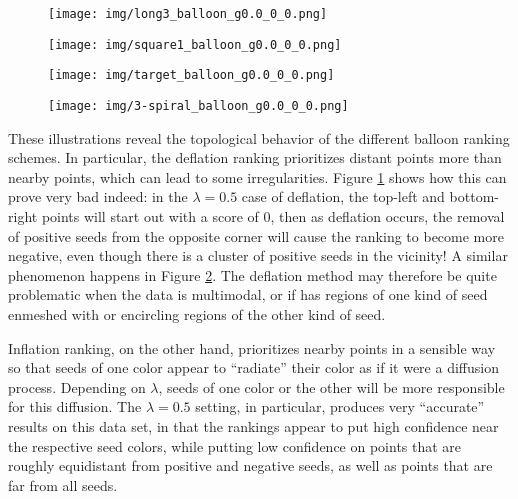 \documentclass[11pt, oneside, fleqn, UTF8]{article} 	%
\theoremstyle{definition}
\begin{document}
\begin{figure*}
    \centering
    
    \begin{subfigure}[b]{\textwidth}
        \centering
        \texttt{[image: img/long3\_balloon\_g0.0\_0\_0.png]}
        \caption{}
    \end{subfigure}
    
    \begin{subfigure}[b]{\textwidth}
        \centering
        \texttt{[image: img/square1\_balloon\_g0.0\_0\_0.png]}
        \caption{}
        \label{square1Balloon}
    \end{subfigure}
    
        \caption{Balloon ranking (inflation and deflation) for various settings of $\lambda$.}   
\end{figure*}
\begin{figure*}\ContinuedFloat

    \begin{subfigure}[b]{\textwidth}
        \centering
        \texttt{[image: img/target\_balloon\_g0.0\_0\_0.png]}
        \caption{}
        \label{targetBalloon}
    \end{subfigure}
    
    \begin{subfigure}[b]{\textwidth}
        \centering
        \texttt{[image: img/3-spiral\_balloon\_g0.0\_0\_0.png]}
        \caption{}
    \end{subfigure}
    
    \caption{Balloon ranking (inflation and deflation) for various settings of $\lambda$.}
\end{figure*}

These illustrations reveal the topological behavior of the different balloon ranking schemes.  In particular, the deflation ranking prioritizes distant points more than nearby points, which can lead to some irregularities.  Figure \ref{square1Balloon} shows how this can prove very bad indeed: in the $\lambda = 0.5$ case of deflation, the top-left and bottom-right points will start out with a score of $0$, then as deflation occurs, the removal of positive seeds from the opposite corner will cause the ranking to become more negative, even though there is a cluster of positive seeds in the vicinity!  A similar phenomenon happens in Figure \ref{targetBalloon}.  The deflation method may therefore be quite problematic when the data is multimodal, or if has regions of one kind of seed enmeshed with or encircling regions of the other kind of seed.

Inflation ranking, on the other hand, prioritizes nearby points in a sensible way so that seeds of one color appear to ``radiate'' their color as if it were a diffusion process.  Depending on $\lambda$, seeds of one color or the other will be more responsible for this diffusion.  The $\lambda = 0.5$ setting, in particular, produces very ``accurate'' results on this data set, in that the rankings appear to put high confidence near the respective seed colors, while putting low confidence on points that are roughly equidistant from positive and negative seeds, as well as points that are far from all seeds.
\end{document}
